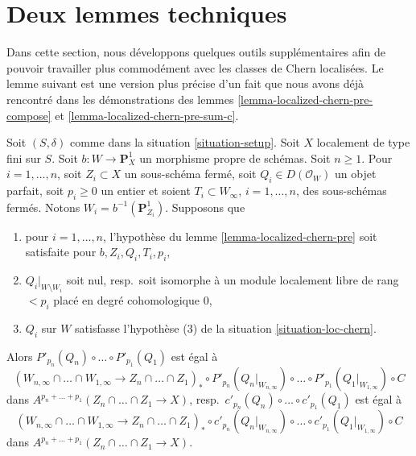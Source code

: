 \section{Deux lemmes techniques}
\label{section-tools-loc-chern}

\noindent
Dans cette section, nous développons quelques outils supplémentaires afin de pouvoir travailler
plus commodément avec les classes de Chern localisées. Le lemme suivant
est une version plus précise d'un fait que nous avons déjà rencontré dans
les démonstrations des lemmes \ref{lemma-localized-chern-pre-compose} et
\ref{lemma-localized-chern-pre-sum-c}.

\begin{lemma}
\label{lemma-homomorphism-final}
Soit $(S, \delta)$ comme dans la situation \ref{situation-setup}. Soit $X$
localement de type fini sur $S$. Soit $b : W \longrightarrow \mathbf{P}^1_X$
un morphisme propre de schémas. Soit $n \geq 1$. Pour $i = 1, \ldots, n$,
soit $Z_i \subset X$ un sous-schéma fermé, soit $Q_i \in D(\mathcal{O}_W)$
un objet parfait, soit $p_i \geq 0$ un entier et soient
$T_i \subset W_\infty$, $i = 1, \ldots, n$, des sous-schémas fermés.
Notons $W_i = b^{-1}(\mathbf{P}^1_{Z_i})$. Supposons que
\begin{enumerate}
\item pour $i = 1, \ldots, n$, l'hypothèse du
lemme \ref{lemma-localized-chern-pre} soit satisfaite pour
$b, Z_i, Q_i, T_i, p_i$,
\item $Q_i|_{W \setminus W_i}$ soit nul, resp.\ soit isomorphe à un module
localement libre de rang $< p_i$ placé en degré cohomologique $0$,
\item $Q_i$ sur $W$ satisfasse
l'hypothèse (3) de la situation \ref{situation-loc-chern}.
\end{enumerate}
Alors $P'_{p_n}(Q_n) \circ \ldots \circ P'_{p_1}(Q_1)$ est égal à
$$
(W_{n, \infty} \cap \ldots \cap W_{1, \infty} \to
Z_n \cap \ldots \cap Z_1)_* \circ
P'_{p_n}(Q_n|_{W_{n, \infty}}) \circ \ldots \circ P'_{p_1}(Q_1|_{W_{1, \infty}})
\circ C
$$
dans $A^{p_n + \ldots + p_1}(Z_n \cap \ldots \cap Z_1 \to X)$,
resp.\ $c'_{p_n}(Q_n) \circ \ldots \circ c'_{p_1}(Q_1)$ est égal à
$$
(W_{n, \infty} \cap \ldots \cap W_{1, \infty} \to
Z_n \cap \ldots \cap Z_1)_* \circ
c'_{p_n}(Q_n|_{W_{n, \infty}}) \circ \ldots \circ c'_{p_1}(Q_1|_{W_{1, \infty}})
\circ C
$$
dans $A^{p_n + \ldots + p_1}(Z_n \cap \ldots \cap Z_1 \to X)$.
\end{lemma}

